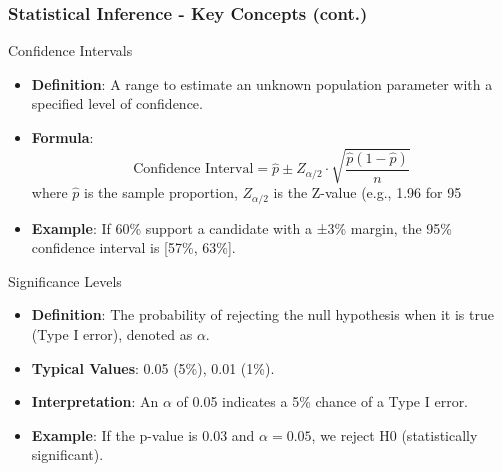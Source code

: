 \documentclass[aspectratio=169]{beamer}
\begin{document}
\begin{frame}[fragile]
    \frametitle{Statistical Inference - Key Concepts (cont.)}
    \begin{block}{Confidence Intervals}
        \begin{itemize}
            \item \textbf{Definition}: A range to estimate an unknown population parameter with a specified level of confidence.
            \item \textbf{Formula}:
            \begin{equation}
                \text{Confidence Interval} = \hat{p} \pm Z_{\alpha/2} \cdot \sqrt{\frac{\hat{p}(1 - \hat{p})}{n}}
            \end{equation}
            where \( \hat{p} \) is the sample proportion, \( Z_{\alpha/2} \) is the Z-value (e.g., 1.96 for 95%
            \item \textbf{Example}: If 60\% support a candidate with a ±3\% margin, the 95\% confidence interval is [57\%, 63\%].
        \end{itemize}
    \end{block}
    
    \begin{block}{Significance Levels}
        \begin{itemize}
            \item \textbf{Definition}: The probability of rejecting the null hypothesis when it is true (Type I error), denoted as \( \alpha \).
            \item \textbf{Typical Values}: 0.05 (5\%), 0.01 (1\%).
            \item \textbf{Interpretation}: An \( \alpha \) of 0.05 indicates a 5\% chance of a Type I error.
            \item \textbf{Example}: If the p-value is 0.03 and \( \alpha = 0.05 \), we reject H0 (statistically significant).
        \end{itemize}
    \end{block}
\end{frame}
\end{document}
